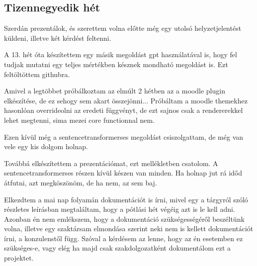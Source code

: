 \documentclass{article}
\begin{document}
\subsection{Tizennegyedik hét}
Szerdán prezentálok, és szerettem volna előtte még egy utolsó helyzetjelentést küldeni, illetve két kérdést feltenni.

A 13. hét óta készítettem egy másik megoldást gpt használatával is, hogy fel tudjak mutatni egy teljes mértékben késznek mondható megoldást is. Ezt feltöltöttem githubra.

Amivel a legtöbbet próbálkoztam az elmúlt 2 hétben az a moodle plugin elkészítése, de ez sehogy sem akart összejönni... Próbáltam a moodle themekhez hasonlóan overrideolni az eredeti függvényt, de ezt sajnos csak a rendererekkel lehet megtenni, sima mezei core functionnal nem.

Ezen kívül még a sentencetransformerses megoldást csiszolgattam, de még van vele egy kis dolgom holnap.

Továbbá elkészítettem a prezentációmat, ezt mellékletben csatolom. A sentencetransformerses  részen kívül készen van minden. Ha holnap jut rá időd átfutni, azt megköszönöm, de ha nem, az sem baj.

Elkezdtem a mai nap folyamán dokumentációt is írni, mivel egy a tárgyról szóló részletes leírásban megtaláltam, hogy a pótlási hét végéig azt is le kell adni. Azonban én nem emlékszem, hogy a dokumentáció szükségességéről beszéltünk volna, illetve egy szaktársam elmondása szerint neki nem is kellett dokumentációt írni, a konzulenstől függ. Szóval a kérdésem az lenne, hogy az én esetemben ez szükséges-e, vagy elég ha majd csak szakdolgozatként dokumentálom ezt a projektet.
\end{document}
